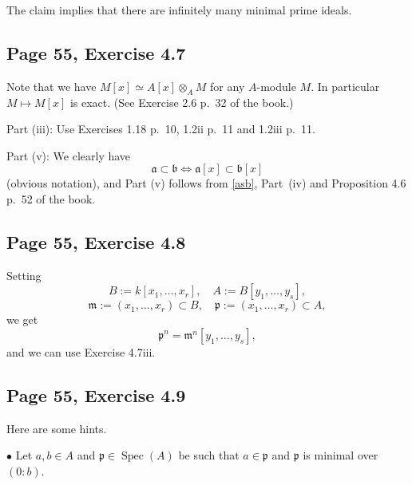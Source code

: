 \documentclass[parskip=half,fontsize=12pt]{scrartcl}%
\newcommand{\oo}{\operatorname}\newcommand{\ooo}{\operatorname*}
\newcommand{\mf}{\mathfrak}
\newcommand{\aaa}{\mf a}
\newcommand{\bbb}{\mf b}
\newcommand{\mmm}{\mf m}
\newcommand{\ppp}{\mf p}
\newcommand{\bu}{\bullet}
\begin{document}
The claim implies that there are infinitely many minimal prime ideals. %

\subsection{Page 55, Exercise 4.7}\label{5547}%

Note that we have $M[x]\simeq A[x]\otimes_AM$ for any $A$-module $M$. In particular $M\mapsto M[x]$ is exact. (See Exercise 2.6 p.~32 of the book.)

Part (iii): Use Exercises 1.18 p.~10, 1.2ii p.~11 and 1.2iii p.~11. %


Part (v): We clearly have 
\begin{equation}\label{asb}
\aaa\subset\bbb\iff\aaa[x]\subset\bbb[x]
\end{equation}
(obvious notation), and Part (v) follows from \eqref{asb}, Part~(iv) and Proposition 4.6 p.~52 of the book.

\subsection{Page 55, Exercise 4.8}%

Setting 
$$
B:=k[x_1,\dots,x_r],\quad A:=B[y_1,\dots,y_s],
$$ 
$$
\mmm:=(x_1,\dots,x_r)\subset B,\quad\ppp:=(x_1,\dots,x_r)\subset A,
$$ 
we get 
$$
\ppp^n=\mmm^n[y_1,\dots,y_s],
$$ 
and we can use Exercise 4.7iii.


\subsection{Page 55, Exercise 4.9}%

Here are some hints.

$\bu$ Let $a,b\in A$ and $\ppp\in\oo{Spec}(A)$ be such that $a\in\ppp$ and $\ppp$ is minimal over $(0:b)$.
\end{document}
